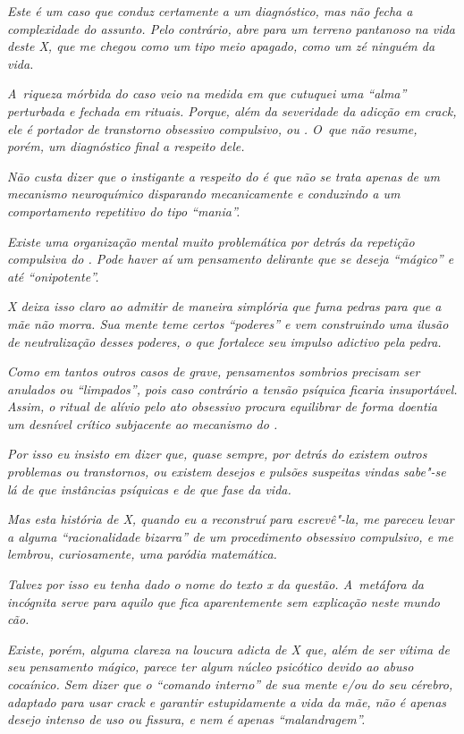 \emph{Este é um caso que conduz certamente a um diagnóstico, mas não
fecha a complexidade do assunto. Pelo contrário, abre para um terreno
pantanoso na vida deste X, que me chegou como um tipo meio apagado, como
um zé ninguém da vida.}

\emph{A~riqueza mórbida do caso veio na medida em que cutuquei uma
``alma'' perturbada e fechada em rituais. Porque, além da severidade da
adicção em crack, ele é portador de transtorno obsessivo compulsivo, ou
. O~que não resume, porém, um diagnóstico final a respeito dele.}

\emph{Não custa dizer que o instigante a respeito do  é que não se
trata apenas de um mecanismo neuroquímico disparando mecanicamente e
conduzindo a um comportamento repetitivo do tipo ``mania''.}

\emph{Existe uma organização mental muito problemática por detrás da
repetição compulsiva do . Pode haver aí um pensamento delirante que
se deseja ``mágico'' e até ``onipotente''.}

\emph{X deixa isso claro ao admitir de maneira simplória que fuma pedras
para que a mãe não morra. Sua mente teme certos ``poderes'' e vem
construindo uma ilusão de neutralização desses poderes, o que fortalece
seu impulso adictivo pela pedra.}

\emph{Como em tantos outros casos de  grave, pensamentos sombrios
precisam ser anulados ou ``limpados'', pois caso contrário a tensão
psíquica ficaria insuportável. Assim, o ritual de alívio pelo ato
obsessivo procura equilibrar de forma doentia um desnível crítico
subjacente ao mecanismo do .}

\emph{Por isso eu insisto em dizer que, quase sempre, por detrás do 
existem outros problemas ou transtornos, ou existem desejos e pulsões
suspeitas vindas sabe"-se lá de que instâncias psíquicas e de que fase da
vida.}

\emph{Mas esta história de X, quando eu a reconstruí para escrevê"-la, me
pareceu levar a alguma ``racionalidade bizarra'' de um procedimento
obsessivo compulsivo, e me lembrou, curiosamente, uma paródia
matemática.}

\emph{Talvez por isso eu tenha dado o nome do texto x da questão. A~metáfora da incógnita serve para aquilo que fica aparentemente sem
explicação neste mundo cão.}

\emph{Existe, porém, alguma clareza na loucura adicta de X que, além de
ser vítima de seu pensamento mágico, parece ter algum núcleo psicótico
devido ao abuso cocaínico. Sem dizer que o ``comando interno'' de sua
mente e/ou do seu cérebro, adaptado para usar crack e garantir
estupidamente a vida da mãe, não é apenas desejo intenso de uso ou
fissura, e nem é apenas ``malandragem''.}

